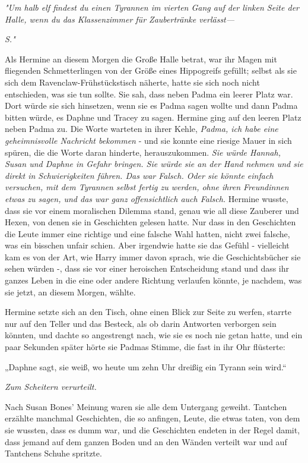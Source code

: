 {\emph{"Um halb elf findest du einen Tyrannen im vierten Gang auf der linken Seite der Halle, wenn du das Klassenzimmer für Zaubertränke verlässt—}

\emph{S."}

Als Hermine an diesem Morgen die Große Halle betrat, war ihr Magen mit fliegenden Schmetterlingen von der Größe eines Hippogreifs gefüllt; selbst als sie sich dem Ravenclaw-Frühstückstisch näherte, hatte sie sich noch nicht entschieden, was sie tun sollte. Sie sah, dass neben Padma ein leerer Platz war. Dort würde sie sich hinsetzen, wenn sie es Padma sagen wollte und dann Padma bitten würde, es Daphne und Tracey zu sagen. Hermine ging auf den leeren Platz neben Padma zu. Die Worte warteten in ihrer Kehle, \emph{Padma, ich habe eine geheimnisvolle Nachricht bekommen} - und sie konnte eine riesige Mauer in sich spüren, die die Worte daran hinderte, herauszukommen. \emph{Sie würde Hannah, Susan und Daphne in Gefahr bringen. Sie würde sie an der Hand nehmen und sie direkt in Schwierigkeiten führen. Das war Falsch. Oder sie könnte einfach versuchen, mit dem Tyrannen selbst fertig zu werden, ohne ihren Freundinnen etwas zu sagen, und das war ganz offensichtlich auch Falsch.} Hermine wusste, dass sie vor einem moralischen Dilemma stand, genau wie all diese Zauberer und Hexen, von denen sie in Geschichten gelesen hatte. Nur dass in den Geschichten die Leute immer eine richtige und eine falsche Wahl hatten, nicht zwei falsche, was ein bisschen unfair schien. Aber irgendwie hatte sie das Gefühl - vielleicht kam es von der Art, wie Harry immer davon sprach, wie die Geschichtsbücher sie sehen würden -, dass sie vor einer heroischen Entscheidung stand und dass ihr ganzes Leben in die eine oder andere Richtung verlaufen könnte, je nachdem, was sie jetzt, an diesem Morgen, wählte.

Hermine setzte sich an den Tisch, ohne einen Blick zur Seite zu werfen, starrte nur auf den Teller und das Besteck, als ob darin Antworten verborgen sein könnten, und dachte so angestrengt nach, wie sie es noch nie getan hatte, und ein paar Sekunden später hörte sie Padmas Stimme, die fast in ihr Ohr flüsterte:

„Daphne sagt, sie weiß, wo heute um zehn Uhr dreißig ein Tyrann sein wird.“

\emph{Zum Scheitern verurteilt.}

Nach Susan Bones' Meinung waren sie alle dem Untergang geweiht. Tantchen erzählte manchmal Geschichten, die so anfingen, Leute, die etwas taten, von dem sie wussten, dass es dumm war, und die Geschichten endeten in der Regel damit, dass jemand auf dem ganzen Boden und an den Wänden verteilt war und auf Tantchens Schuhe spritzte.

}
